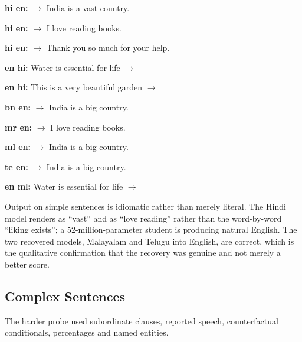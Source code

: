 \begin{bullets}
\item \textbf{hi \arrowto{} en:}  $\rightarrow$ India is a vast country.
\item \textbf{hi \arrowto{} en:}  $\rightarrow$ I love reading books.
\item \textbf{hi \arrowto{} en:}  $\rightarrow$ Thank you so much for your help.
\item \textbf{en \arrowto{} hi:} Water is essential for life $\rightarrow$ 
\item \textbf{en \arrowto{} hi:} This is a very beautiful garden $\rightarrow$ 
\item \textbf{bn \arrowto{} en:}  $\rightarrow$ India is a big country.
\item \textbf{mr \arrowto{} en:}  $\rightarrow$ I love reading books.
\item \textbf{ml \arrowto{} en:}  $\rightarrow$ India is a big country.
\item \textbf{te \arrowto{} en:}  $\rightarrow$ India is a big country.
\item \textbf{en \arrowto{} ml:} Water is essential for life $\rightarrow$\newline
{}
\end{bullets}

Output on simple sentences is idiomatic rather than merely literal. The Hindi
model renders  as ``vast'' and  as ``love reading''
rather than the word-by-word ``liking exists''; a 52-million-parameter
student is producing natural English. The two recovered models, Malayalam and
Telugu into English, are correct, which is the qualitative confirmation that the
recovery was genuine and not merely a better score.

\subsection{Complex Sentences}
\label{subsec:complexsentences}

The harder probe used subordinate clauses, reported speech, counterfactual
conditionals, percentages and named entities.

